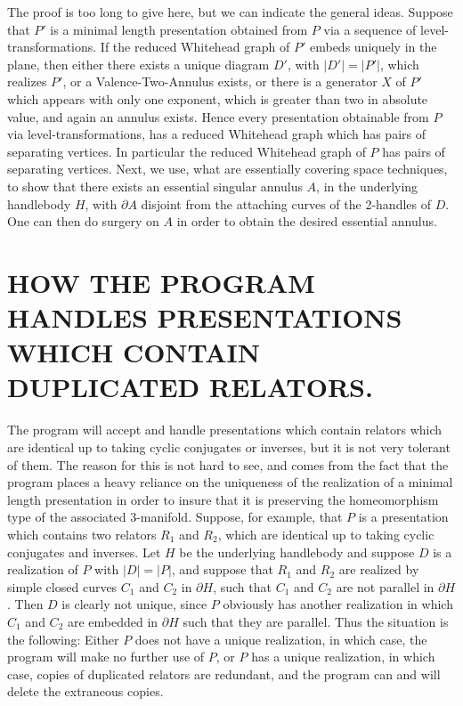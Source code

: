 \documentclass[12pt]{amsart}
\begin{document}
                The proof is too long to give here, but we can indicate the general ideas.
        Suppose that $P'$ is a minimal length presentation obtained from $P$ via a sequence of
        level-transformations. If the reduced Whitehead graph of $P'$ embeds uniquely in the
        plane, then either there exists a unique diagram $D'$, with $|D'| = |P'|$, which realizes
        $P'$, or a Valence-Two-Annulus exists, or there is a generator $X$ of $P'$ which appears
        with only one exponent, which is greater than two in absolute value, and again an
        annulus exists. Hence every presentation obtainable from $P$ via level-transformations,
        has a reduced Whitehead graph which has pairs of separating vertices. In particular
        the reduced Whitehead graph of $P$ has pairs of separating vertices.
                Next, we use, what are essentially covering space techniques, to show that there
        exists an essential singular annulus $A$, in the underlying handlebody $H$, with $\partial A$
        disjoint from the attaching curves of the 2-handles of $D$. One can then do surgery on
        $A$ in order to obtain the desired essential annulus.
                 

 \section{HOW THE PROGRAM HANDLES PRESENTATIONS WHICH CONTAIN DUPLICATED RELATORS.}
                        
                The program will accept and handle presentations which contain relators which are
        identical up to taking cyclic conjugates or inverses, but it is not very tolerant of
        them. The reason for this is not hard to see, and comes from the fact that the program
        places a heavy reliance on the uniqueness of the realization of a minimal length
        presentation in order to insure that it is preserving the homeomorphism type of the
        associated 3-manifold.
                Suppose, for example, that $P$ is a presentation which contains two relators $R_1$ and
        $R_2$, which are identical up to taking cyclic conjugates and inverses. Let $H$ be the
        underlying handlebody and suppose $D$ is a realization of $P$ with $|D| = |P|$, and suppose
        that $R_1$ and $R_2$ are realized by simple closed curves $C_1$ and $C_2$ in $\partial H$, such that $C_1$ and
        $C_2$ are not parallel in $\partial H$. Then $D$ is clearly not unique, since $P$ obviously has another
        realization in which $C_1$ and $C_2$ are embedded in $\partial H$ such that they are parallel.
                Thus the situation is the following: Either $P$ does not have a unique realization,
        in which case, the program will make no further use of $P$, or $P$ has a unique realization,
        in which case, copies of duplicated relators are redundant, and the program can and will
        delete the extraneous copies.           
\end{document}
